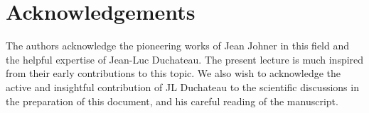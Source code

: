 \section*{Acknowledgements}
The authors acknowledge the pioneering works of Jean Johner in this field and the helpful expertise of Jean-Luc Duchateau. The present lecture is much inspired from their early contributions to this topic.
We also wish to acknowledge the active and insightful contribution of JL Duchateau to the scientific discussions in the preparation of this document, and his careful reading of the manuscript.

